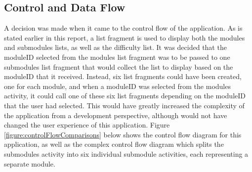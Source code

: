 \documentclass{article}
\begin{document}
\subsection{Control and Data Flow}

A decision was made when it came to the control flow of the application. As is stated earlier in this report, a list fragment is used to display both the modules and submodules lists, as well as the difficulty list. It was decided that the moduleID selected from the modules list fragment was to be passed to one submodules list fragment that would collect the list to display based on the moduleID that it received. Instead, six list fragments could have been created, one for each module, and when a moduleID was selected from the modules activity, it could call one of these six list fragments depending on the moduleID that the user had selected. This would have greatly increased the complexity of the application from a development perspective, although would not have changed the user experience of this application. Figure \ref{figure:controlFlowComparisons} below shows the control flow diagram for this application, as well as the complex control flow diagram which splits the submodules activity into six individual submodule activities, each representing a separate module.
\end{document}
